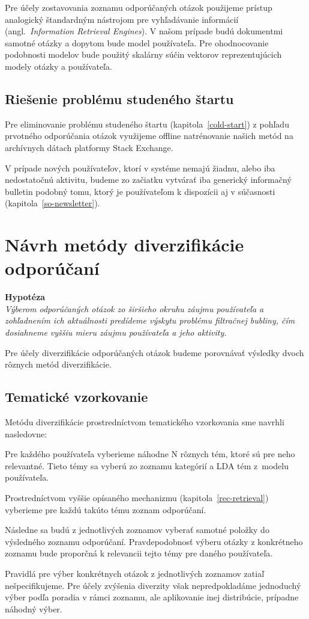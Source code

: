 Pre účely zostavovania zoznamu odporúčaných otázok použijeme prístup analogický štandardným nástrojom pre vyhľadávanie
informácií (angl.~\emph{Information Retrieval Engines}). V našom prípade budú dokumentmi samotné otázky a dopytom bude
model používateľa. Pre ohodnocovanie podobnosti modelov bude použitý skalárny súčin vektorov reprezentujúcich
modely otázky a používateľa.


\subsection{Riešenie problému studeného štartu}

Pre eliminovanie problému studeného štartu (kapitola~\ref{cold-start}) z pohľadu prvotného odporúčania otázok využijeme
offline natrénovanie našich metód na archívnych dátach platformy Stack Exchange.

V prípade nových používateľov, ktorí v systéme nemajú žiadnu, alebo iba nedostatočnú aktivitu, budeme zo začiatku vytvárať
iba generický informačný bulletin podobný tomu, ktorý je používateľom k dispozícii aj v súčasnosti (kapitola~\ref{so-newsletter}).


\section{Návrh metódy diverzifikácie odporúčaní}

\textbf{Hypotéza}\\
\textit{Výberom odporúčaných otázok zo širšieho okruhu záujmu používateľa a zohľadnením ich aktuálnosti predídeme výskytu problému
filtračnej bubliny, čím dosiahneme vyššiu mieru záujmu používateľa a jeho aktivity.}

Pre účely diverzifikácie odporúčaných otázok budeme porovnávať výsledky dvoch rôznych metód diverzifikácie.

\subsection{Tematické vzorkovanie}
Metódu diverzifikácie prostredníctvom tematického vzorkovania sme navrhli nasledovne:

\begin{my_enumerate}
\item{
  Pre každého používateľa vyberieme náhodne N rôznych tém, ktoré sú pre neho relevantné. Tieto témy sa vyberú zo zoznamu
  kategórií a LDA tém z~modelu používateľa.
}
\item{
  Prostredníctvom vyššie opísaného mechanizmu (kapitola~\ref{rec-retrieval}) vyberieme pre každú takúto tému zoznam
  odporúčaní.
}
\item{
  Následne sa budú z jednotlivých zoznamov vyberať samotné položky do výsledného zoznamu odporúčaní. Pravdepodobnosť výberu
  otázky z konkrétneho zoznamu bude proporčná k relevancii tejto témy pre daného používateľa.
}
\item{
  Pravidlá pre výber konkrétnych otázok z jednotlivých zoznamov zatiaľ nešpecifikujeme. Pre účely zvýšenia diverzity však
  nepredpokladáme jednoduchý výber podľa poradia v rámci zoznamu, ale aplikovanie inej distribúcie, prípadne náhodný výber.
}
\end{my_enumerate}

